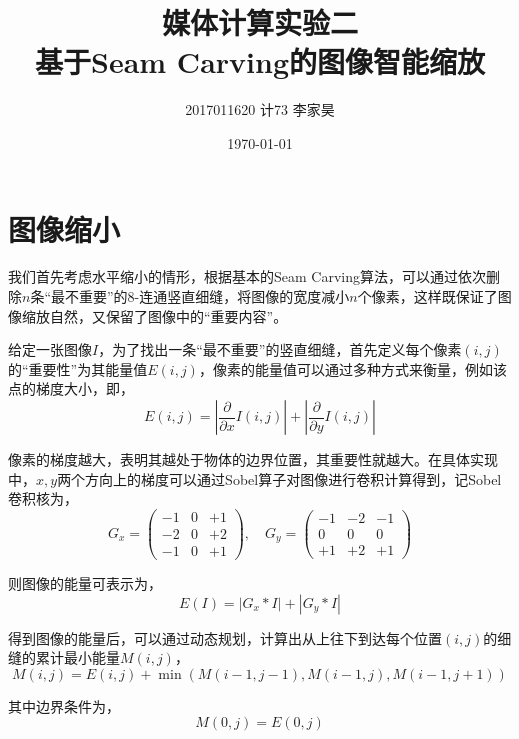 \documentclass[11pt,a4paper]{article}
\title{媒体计算实验二\\基于Seam Carving的图像智能缩放}
\author{2017011620 \quad 计73 \quad 李家昊}
\date{\today}
\begin{document}
\maketitle

\section{图像缩小}

我们首先考虑水平缩小的情形，根据基本的Seam Carving算法\cite{avidan2007seam}，可以通过依次删除$n$条“最不重要”的8-连通竖直细缝，将图像的宽度减小$n$个像素，这样既保证了图像缩放自然，又保留了图像中的“重要内容”。

给定一张图像$I$，为了找出一条“最不重要”的竖直细缝，首先定义每个像素$(i,j)$的“重要性”为其能量值$E(i,j)$，像素的能量值可以通过多种方式来衡量，例如该点的梯度大小，即，
\begin{equation}
    E(i,j) = \left|\frac{\partial}{\partial x} I(i,j)\right| + \left|\frac{\partial}{\partial y} I(i,j)\right|
\end{equation}

像素的梯度越大，表明其越处于物体的边界位置，其重要性就越大。在具体实现中，$x,y$两个方向上的梯度可以通过Sobel算子对图像进行卷积计算得到，记Sobel卷积核为，
\begin{equation}
    G_x = \left(
    \begin{matrix}
        -1 & 0 & +1 \\
        -2 & 0 & +2 \\
        -1 & 0 & +1
    \end{matrix}
    \right),
    \quad
    G_y = \left(
    \begin{matrix}
        -1 & -2 & -1 \\
        0 & 0 & 0 \\
        +1 & +2 & +1
    \end{matrix}
    \right)
\end{equation}

则图像的能量可表示为，
\begin{equation}
    E(I) = |G_x * I| + |G_y * I|
\end{equation}

得到图像的能量后，可以通过动态规划，计算出从上往下到达每个位置$(i,j)$的细缝的累计最小能量$M(i,j)$，
\begin{equation}
    M(i,j) = E(i, j) + \min(M(i-1,j-1), M(i-1,j), M(i-1, j+1))
\end{equation}

其中边界条件为，
\begin{equation}
    M(0,j) = E(0, j)
\end{equation}
\end{document}
